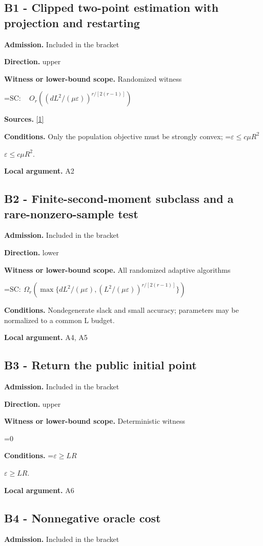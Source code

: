 \documentclass[10pt,a4paper]{article}
\newcommand{\AtlasMath}[1]{\par\begingroup\centering\setbox0=\hbox{$\displaystyle #1$}\ifdim\wd0>1.4\linewidth\typeout{ATLAS WIDE FORMULA: \the\wd0}\fi\ifdim\wd0>\linewidth\resizebox{\linewidth}{!}{\box0}\else\box0\fi\par\endgroup}
\newcommand{\AtlasInlineMath}[1]{\begingroup\setbox0=\hbox{$#1$}\ifdim\wd0>.4\linewidth\endgroup\AtlasMath{#1}\else\endgroup$#1$\fi}
\begin{document}
\subsection{B1 - Clipped two-point estimation with projection and restarting}
\textbf{Admission.} Included in the bracket

\textbf{Direction.} upper

\textbf{Witness or lower-bound scope.} Randomized witness

\AtlasMath{\mathrm{SC}:\quad O_r((dL^2/(\mu\varepsilon))^{r/[2(r-1)]})}
\textbf{Sources.} \href{https://jmlr.org/papers/volume18/16-632/16-632.pdf}{[1]}

\textbf{Conditions.} Only the population objective must be strongly convex; \AtlasInlineMath{\varepsilon\le c\mu R^2}.

\textbf{Local argument.} A2

\subsection{B2 - Finite-second-moment subclass and a rare-nonzero-sample test}
\textbf{Admission.} Included in the bracket

\textbf{Direction.} lower

\textbf{Witness or lower-bound scope.} All randomized adaptive algorithms

\AtlasMath{\mathrm{SC}:\ \Omega_r\!\left(\max\{dL^2/(\mu\varepsilon),(L^2/(\mu\varepsilon))^{r/[2(r-1)]}\}\right)}
\textbf{Conditions.} Nondegenerate slack and small accuracy; parameters may be normalized to a common L budget.

\textbf{Local argument.} A4, A5

\subsection{B3 - Return the public initial point}
\textbf{Admission.} Included in the bracket

\textbf{Direction.} upper

\textbf{Witness or lower-bound scope.} Deterministic witness

\AtlasMath{0}
\textbf{Conditions.} \AtlasInlineMath{\varepsilon\ge LR}.

\textbf{Local argument.} A6

\subsection{B4 - Nonnegative oracle cost}
\textbf{Admission.} Included in the bracket
\end{document}
